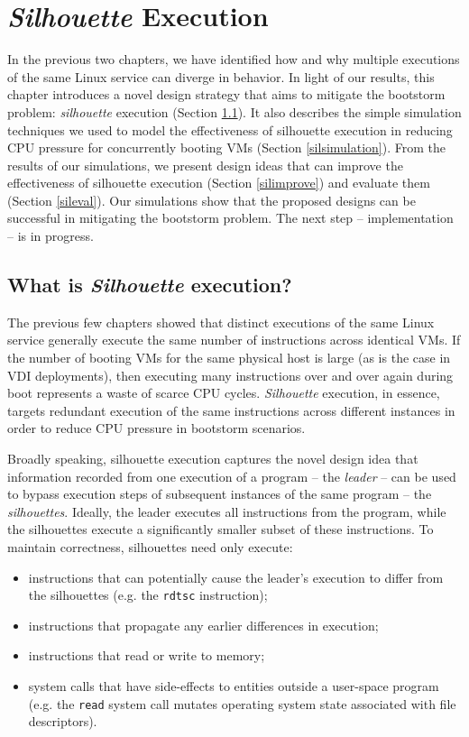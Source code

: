 \chapter{{\em Silhouette} Execution}
In the previous two chapters,
we have identified how and why
multiple executions of the same
Linux service can diverge in behavior.
In light of our results, this chapter introduces a 
novel design strategy that aims to mitigate the bootstorm problem:
{\em silhouette} execution (Section \ref{def:sil}).
It also describes the simple simulation techniques we used 
to model the effectiveness of silhouette
execution in reducing CPU pressure for concurrently booting VMs 
(Section \ref{silsimulation}).
From the results of our simulations, we present design ideas
that can improve the effectiveness of
silhouette execution (Section \ref{silimprove})
and evaluate them (Section \ref{sileval}).
Our simulations show that the proposed designs can be successful
in mitigating the bootstorm problem. 
The next step -- implementation -- 
is in progress.

\section{What is {\em Silhouette} execution?} \label{def:sil}
The previous few chapters showed that
distinct executions of the same Linux service
generally execute the same number of instructions
across identical VMs. If the number of booting VMs for
the same physical host is large (as is 
the case in VDI deployments),
then executing many instructions over
and over again during boot represents a waste of scarce CPU cycles.
{\em Silhouette} execution, in essence, targets
redundant execution of the same instructions across different
instances in order to reduce CPU pressure in bootstorm
scenarios. 

Broadly speaking, silhouette execution captures the
novel design idea that information recorded from one
execution of a program -- the {\em leader} -- can be used to 
bypass execution steps of subsequent instances
of the same program -- the {\em silhouettes}. 
Ideally, the leader executes all instructions from the program, 
while the silhouettes execute a significantly smaller subset
of these instructions. To maintain correctness,
silhouettes need only execute: 

\begin{itemize}
\item instructions that can potentially cause the leader's
  execution to differ from the silhouettes (e.g. the \texttt{rdtsc}
  instruction); 
\item instructions that propagate any earlier differences in execution; 
\item instructions that read or write to memory;
\item system calls that have side-effects to entities
  outside a user-space program
  (e.g. the \texttt{read} system call mutates operating system 
  state associated with file descriptors).
  
\end{itemize}

